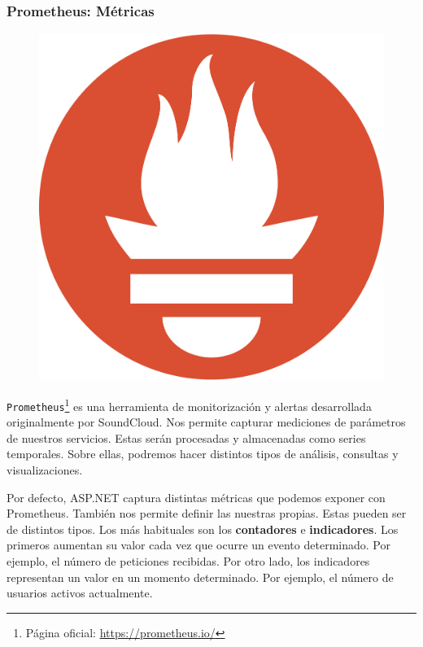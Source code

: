 \subsubsection{Prometheus: Métricas}

\begin{figure}
  \vspace{-12pt}
  \centering
  \includegraphics[scale=0.025]{cap_despliegue/images/prometheus-logo}
\end{figure}

\texttt{Prometheus}\footnote{Página oficial: \url{https://prometheus.io/}} es una herramienta de monitorización y alertas desarrollada originalmente por SoundCloud. Nos permite capturar mediciones de parámetros de nuestros servicios. Estas serán procesadas y almacenadas como series temporales. Sobre ellas, podremos hacer distintos tipos de análisis, consultas y visualizaciones.

Por defecto, ASP.NET captura distintas métricas que podemos exponer con Prometheus. También nos permite definir las nuestras propias. Estas pueden ser de distintos tipos. Los más habituales son los \textbf{contadores} e \textbf{indicadores}. \cite{parkerProblemDistributedTracing2020} Los primeros aumentan su valor cada vez que ocurre un evento determinado. Por ejemplo, el número de peticiones recibidas. Por otro lado, los indicadores representan un valor en un momento determinado. Por ejemplo, el número de usuarios activos actualmente.

